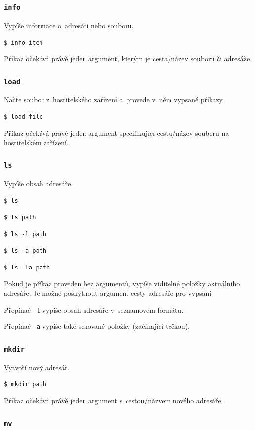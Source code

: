 \documentclass[12pt]{article}
\begin{document}
\subsubsection{\texttt{info}}\label{sec:info}

Vypíše informace o~adresáři nebo souboru.

\texttt{\$ info item}

Příkaz očekává právě jeden argument, kterým je cesta/název souboru či adresáže.

\subsubsection{\texttt{load}}\label{sec:load}

Načte soubor z~hostitelského zařízení a~provede v~něm vypsané příkazy.

\texttt{\$ load file}

Příkaz očekává právě jeden argument specifikující cestu/název souboru na hostitelském zařízení.

\subsubsection{\texttt{ls}}\label{sec:ls}

Vypíše obsah adresáře.

\texttt{\$ ls}

\texttt{\$ ls path}

\texttt{\$ ls -l path}

\texttt{\$ ls -a path}

\texttt{\$ ls -la path}

Pokud je příkaz proveden bez argumentů, vypíše viditelné položky aktuálního adresáře.
Je možné poskytnout argument cesty adresáře pro vypsání.

Přepínač \texttt{-l} vypíše obsah adresáře v~seznamovém formátu.

Přepínač \texttt{-a} vypíše také schované položky (začínající tečkou).

\subsubsection{\texttt{mkdir}}\label{sec:mkdir}

Vytvoří nový adresář.

\texttt{\$ mkdir path}

Příkaz očekává právě jeden argument s~cestou/názvem nového adresáře.

\subsubsection{\texttt{mv}}\label{sec:mv}
\end{document}
